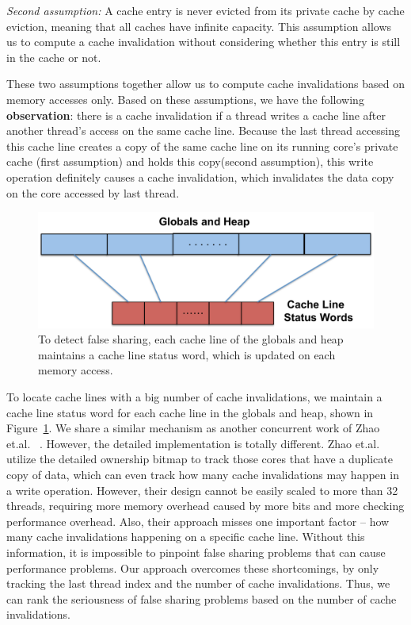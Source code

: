 {\it Second assumption:} 
A cache entry is never evicted from its private cache by cache eviction, meaning that all caches have infinite capacity. This assumption allows us to compute a cache invalidation without considering whether this entry is still in the cache or not. 

These two assumptions together allow us to compute cache invalidations based on memory accesses only. Based on these assumptions, we have the following {\bf observation}: there is a cache invalidation if a thread writes a cache line after another thread's access on the same cache line. Because the last thread accessing this cache line creates a copy of the same cache line on its running core's private cache (first assumption) and holds this copy(second assumption), this write operation definitely causes a cache invalidation, which invalidates the data copy on the core accessed by last thread. 


\begin{figure}[!t]
\centering
\includegraphics[width=6in]{fig/cachelinestatuswords}
\caption{
To detect false sharing, each cache line of the globals and heap maintains a cache line status word, which is updated on each memory access. \label{fig:cachelinestatusword}}
\end{figure}


To locate cache lines with a big number of cache invalidations, we maintain a cache line status word for each cache line in the globals and heap, shown in Figure~\ref{fig:cachelinestatusword}. We share a similar mechanism as another concurrent work of Zhao et.al. ~\cite{qinzhao}. 
However, the detailed implementation is totally different. Zhao et.al. utilize the detailed ownership bitmap to track those cores that have a duplicate copy of data, which can even track how many cache invalidations may happen in a write operation. However, their design cannot be easily scaled to more than 32 threads, requiring more memory overhead caused by more bits and more checking performance overhead. Also, their approach misses one important factor -- how many cache invalidations happening on a specific cache line. Without this information, it is impossible to pinpoint false sharing problems that can cause performance problems.
Our approach overcomes these shortcomings, by only tracking the last thread index and the number of cache invalidations.  Thus, we can rank the seriousness of false sharing problems based on the number of cache invalidations.
 

